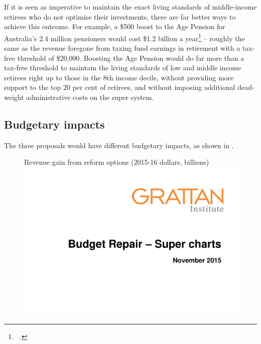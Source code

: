 If it is seen as imperative to maintain the exact living standards of middle-income retirees who do not optimise their investments, there are far better ways to achieve this outcome. For example, a \$500 boost to the Age Pension for Australia’s 2.4 million pensioners would cost \$1.2 billion a year\footnote{\gao\ \textcite{NationalCommissionAudit2014}.}  – roughly the same as the revenue foregone from taxing fund earnings in retirement with a tax-free threshold of \$20,000. Boosting the Age Pension would do far more than a tax-free threshold to maintain the living standards of low and middle income retirees right up to those in the 8th income decile, without providing more support to the top 20 per cent of retirees, and without imposing additional dead-weight administrative costs on the super system.

\subsection{Budgetary impacts}
The three proposals would have different budgetary impacts, as shown in .  

\begin{figure}
%
{Revenue gain from reform options (2015-16 dollars, billions)}
\includegraphics[width=\columnwidth,page=33]{super-atlas/PPTX.pdf}

\end{figure}

